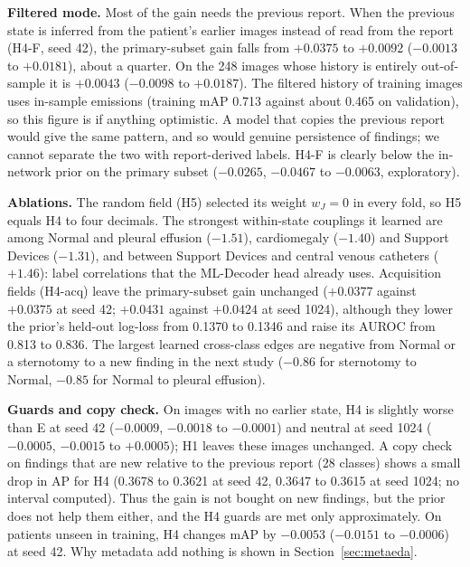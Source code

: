 \documentclass[conference]{IEEEtran}
\begin{document}
\textbf{Filtered mode.} Most of the gain needs the previous report. When the previous state is inferred from the patient's earlier images instead of read from the report (H4-F, seed 42), the primary-subset gain falls from $+0.0375$ to $+0.0092$ ($-0.0013$ to $+0.0181$), about a quarter. On the 248 images whose history is entirely out-of-sample it is $+0.0043$ ($-0.0098$ to $+0.0187$). The filtered history of training images uses in-sample emissions (training mAP 0.713 against about 0.465 on validation), so this figure is if anything optimistic. A model that copies the previous report would give the same pattern, and so would genuine persistence of findings; we cannot separate the two with report-derived labels. H4-F is clearly below the in-network prior on the primary subset ($-0.0265$, $-0.0467$ to $-0.0063$, exploratory).

\textbf{Ablations.} The random field (H5) selected its weight $w_J = 0$ in every fold, so H5 equals H4 to four decimals. The strongest within-state couplings it learned are among Normal and pleural effusion ($-1.51$), cardiomegaly ($-1.40$) and Support Devices ($-1.31$), and between Support Devices and central venous catheters ($+1.46$): label correlations that the ML-Decoder head already uses. Acquisition fields (H4-acq) leave the primary-subset gain unchanged ($+0.0377$ against $+0.0375$ at seed 42; $+0.0431$ against $+0.0424$ at seed 1024), although they lower the prior's held-out log-loss from 0.1370 to 0.1346 and raise its AUROC from 0.813 to 0.836. The largest learned cross-class edges are negative from Normal or a sternotomy to a new finding in the next study ($-0.86$ for sternotomy to Normal, $-0.85$ for Normal to pleural effusion).

\textbf{Guards and copy check.} On images with no earlier state, H4 is slightly worse than E at seed 42 ($-0.0009$, $-0.0018$ to $-0.0001$) and neutral at seed 1024 ($-0.0005$, $-0.0015$ to $+0.0005$); H1 leaves these images unchanged. A copy check on findings that are new relative to the previous report (28 classes) shows a small drop in AP for H4 (0.3678 to 0.3621 at seed 42, 0.3647 to 0.3615 at seed 1024; no interval computed). Thus the gain is not bought on new findings, but the prior does not help them either, and the H4 guards are met only approximately. On patients unseen in training, H4 changes mAP by $-0.0053$ ($-0.0151$ to $-0.0006$) at seed 42. Why metadata add nothing is shown in Section~\ref{sec:metaeda}.
\end{document}
